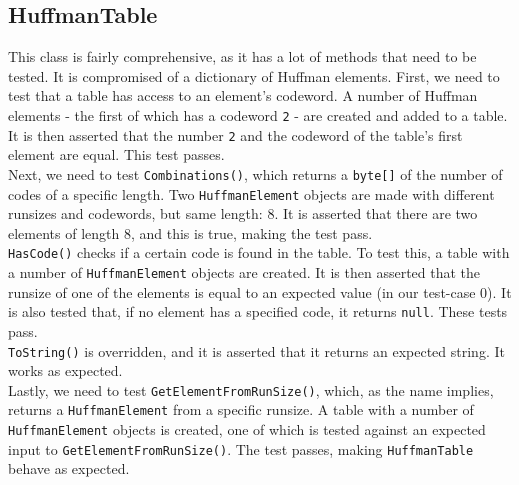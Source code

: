 \subsection{HuffmanTable}
This class is fairly comprehensive, as it has a lot of methods that need to be tested.
It is compromised of a dictionary of Huffman elements.
First, we need to test that a table has access to an element's codeword.
A number of Huffman elements - the first of which has a codeword \lstinline|2| - are created and added to a table.
It is then asserted that the number \lstinline|2| and the codeword of the table's first element are equal.
This test passes.\\
Next, we need to test \lstinline|Combinations()|, which returns a \lstinline|byte[]| of the number of codes of a specific length.
Two \lstinline|HuffmanElement| objects are made with different runsizes and codewords, but same length: 8.
It is asserted that there are two elements of length 8, and this is true, making the test pass.\\
\lstinline|HasCode()| checks if a certain code is found in the table.
To test this, a table with a number of \lstinline|HuffmanElement| objects are created.
It is then asserted that the runsize of one of the elements is equal to an expected value (in our test-case 0).
It is also tested that, if no element has a specified code, it returns \lstinline|null|.
These tests pass.\\
\lstinline|ToString()| is overridden, and it is asserted that it returns an expected string.
It works as expected.\\
Lastly, we need to test \lstinline|GetElementFromRunSize()|, which, as the name implies, returns a \lstinline|HuffmanElement| from a specific runsize.
A table with a number of \lstinline|HuffmanElement| objects is created, one of which is tested against an expected input to \lstinline|GetElementFromRunSize()|.
The test passes, making \lstinline|HuffmanTable| behave as expected.

